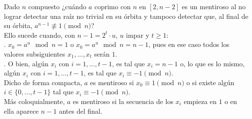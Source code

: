 Dado $n$ compuesto ¿cuándo $a$ coprimo con $n$ en $[2, n-2]$ es un mentiroso al no lograr detectar una raíz no trivial en su órbita y tampoco detectar que, al final de su órbita, $a^{n-1} \not\equiv 1 \pmod n$? \\
Ello sucede cuando, con $n-1 = 2^t \cdot u$, $u$ impar y $t \geq 1$: \\
. $x_0 = a^u \mod n = 1$ o $x_0 = a^u \mod n = n-1$, pues en ese caso todos los valores subsiguientes $x_1, \dots, x_t$ serán $1$. \\
. O bien, algún $x_i$ con $i=1, \dots,t-1$, es tal que $x_i=n-1$ o, lo que es lo mismo, algún $x_i$ con $i=1, \dots,t-1$, es tal que $x_i \equiv -1 \pmod n$. \\
Dicho de forma compacta, $a$ es mentiroso si $x_0 \equiv 1 \pmod n$ o si existe algún $i \in \{0,\dots,t-1\}$ tal que $x_i \equiv -1 \pmod n$. \\
Más coloquialmente, $a$ es mentiroso si la secuencia de los $x_i$ empieza en $1$ o en ella aparece $n-1$ antes del final.

